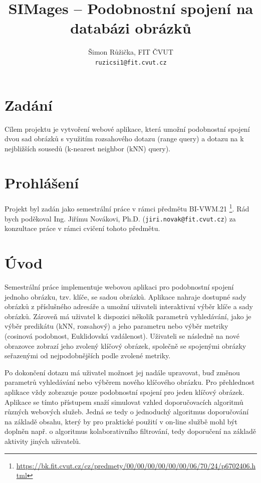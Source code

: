 \documentclass[12pt]{article}
\title{SIMages -- Podobnostní spojení na databázi obrázků}
\author{
    Šimon Růžička, FIT ČVUT\\
    \texttt{ruzicsi1@fit.cvut.cz}
    }
\begin{document}
\maketitle

\section*{Zadání}

Cílem projektu je vytvoření webové aplikace, která umožní podobnostní spojení dvou sad obrázků s využitím
rozsahového dotazu (range query) a dotazu na k nejbližších sousedů (k-nearest neighbor (kNN) query).

\section*{Prohlášení}

Projekt byl zadán jako semestrální práce v rámci předmětu BI-VWM.21%
\footnote{\url{https://bk.fit.cvut.cz/cz/predmety/00/00/00/00/00/00/06/70/24/p6702406.html}}.
Rád bych poděkoval Ing. Jiřímu Novákovi, Ph.D. (\texttt{jiri.novak@fit.cvut.cz}) za konzultace práce v rámci cvičení tohoto předmětu.

\section{Úvod}

Semestrální práce implementuje webovou aplikaci pro podobnostní spojení jednoho obrázku, tzv. klíče, se sadou obrázků.
Aplikace nahraje dostupné sady obrázků z příslušného adresáře a umožní uživateli interaktivní výběr klíče a sady obrázků.
Zároveň má uživatel k dispozici několik parametrů vyhledávání, jako je výběr predikátu (kNN, rozsahový) a jeho parametru nebo výběr metriky (cosinová podobnost, Euklidovská vzdálenost).
Uživateli se následně na nové obrazovce zobrazí jeho zvolený klíčový obrázek, společně se spojenými obrázky seřazenými od nejpodobnějších podle zvolené metriky.

Po dokončení dotazu má uživatel možnost jej nadále upravovat, buď změnou parametrů vyhledávání nebo výběrem nového klíčového obrázku.
Pro přehlednost aplikace vždy zobrazuje pouze podobnostní spojení pro jeden klíčový obrázek.
Aplikace se tímto přístupem snaží simulovat vzhled doporučovacích algoritmů různých webových služeb.
Jedná se tedy o jednoduchý algoritmus doporučování na základě obsahu, který by pro praktické použití v on-line službě mohl být doplněn např. o algoritmus kolaborativního filtrování, tedy doporučení na základě aktivity jiných uživatelů.
\end{document}
